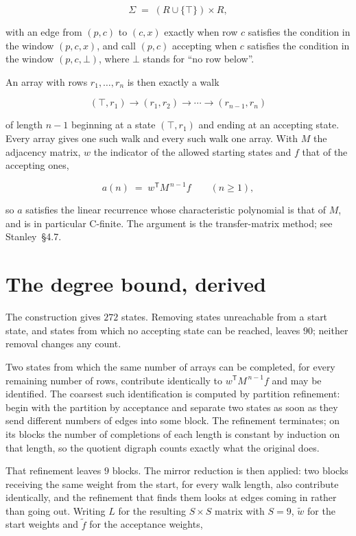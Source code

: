 \documentclass[11pt]{article}
\theoremstyle{definition}
\begin{document}
\[\Sigma \;=\; (R \cup \{\top\}) \times R,\]

with an edge from $(p,c)$ to $(c,x)$ exactly when row $c$ satisfies the condition in the window $(p,c,x)$, and call $(p,c)$ accepting when $c$ satisfies the condition in the window $(p,c,\bot)$, where $\bot$ stands for ``no row below''.

An array with rows $r_1,\dots,r_n$ is then exactly a walk

\[(\top,r_1) \to (r_1,r_2) \to \cdots \to (r_{n-1},r_n)\]

of length $n-1$ beginning at a state $(\top,r_1)$ and ending at an accepting state. Every array gives one such walk and every such walk one array. With $M$ the adjacency matrix, $w$ the indicator of the allowed starting states and $f$ that of the accepting ones,

\[a(n) \;=\; w^{\mathsf T} M^{\,n-1} f \qquad (n \ge 1),\]

so $a$ satisfies the linear recurrence whose characteristic polynomial is that of $M$, and is in particular C-finite. The argument is the transfer-matrix method; see Stanley~\S4.7.

\section{The degree bound, derived}

The construction gives $272$ states. Removing states unreachable from a start state, and states from which no accepting state can be reached, leaves $90$; neither removal changes any count.

Two states from which the same number of arrays can be completed, for every remaining number of rows, contribute identically to $w^{\mathsf T}M^{\,n-1}f$ and may be identified. The coarsest such identification is computed by partition refinement: begin with the partition by acceptance and separate two states as soon as they send different numbers of edges into some block. The refinement terminates; on its blocks the number of completions of each length is constant by induction on that length, so the quotient digraph counts exactly what the original does.

That refinement leaves $9$ blocks. The mirror reduction is then applied: two blocks receiving the same weight from the start, for every walk length, also contribute identically, and the refinement that finds them looks at edges coming in rather than going out. Writing $L$ for the resulting $S \times S$ matrix with $S = 9$, $\tilde w$ for the start weights and $\tilde f$ for the acceptance weights,
\end{document}
